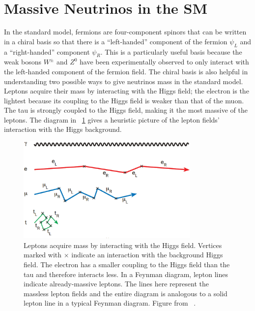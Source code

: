 \section{Massive Neutrinos in the SM}
\label{sec:mass}

In the standard model, fermions are four-component spinors that can be written in a chiral basis so that there is a ``left-handed'' component of the fermion $\psi_L$ and a ``right-handed'' component $\psi_R$.  This is a particularly useful basis because the weak bosons $W^{\pm}$ and $Z^0$ have been experimentally observed to only interact with the left-handed component of the fermion field.  The chiral basis is also helpful in understanding two possible ways to give neutrinos mass in the standard model.  Leptons acquire their mass by interacting with the Higgs field; the electron is the lightest because its coupling to the Higgs field is weaker than that of the muon.  The tau is strongly coupled to the Higgs field, making it the most massive of the leptons.  The diagram in {\fig}~\ref{fig:leptonMass} gives a heuristic picture of the lepton fields' interaction with the Higgs background.  
\begin{figure}[htp]
\centering
\includegraphics[width=0.8\textwidth]{figures/leptonMass.eps}
\caption{Leptons acquire mass by interacting with the Higgs field.  Vertices marked with $\times$ indicate an interaction with the background Higgs field.  The electron has a smaller coupling to the Higgs field than the tau and therefore interacts less.  In a Feynman diagram, lepton lines indicate already-massive leptons.  The lines here represent the  massless lepton fields and the entire diagram is analogous to a solid lepton line in a typical Feynman diagram.  Figure from {}~\cite{neutrinoMass}.}
\label{fig:leptonMass}
\end{figure}
